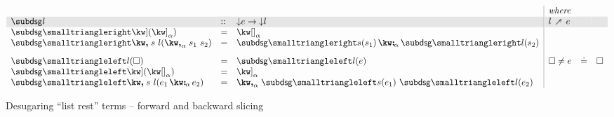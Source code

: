 \begin{figure}[H]
\small
$\begin{array}{lll|llll}
   \arrayrulecolor{lightgray}
   &&&\textit{where}
   \\
   \rowcolor{verylightgray}
   \desugarGC{l} &::& \Below{e} \to \Below{l}
   & l \desugarFwd e
   &&
   \\
   \desugarFwdF{\exListEnd}(\annot{\exListEnd}{\alpha})
   &=&
   \annot{\exNil}{\alpha}
   \\
   \desugarFwdF{\exListNext{s}{l}}(\annListNext{s_1}{s_2}{\alpha})
   &=&
   \annCons{\desugarFwdF{s}(s_1)}{\desugarFwdF{l}(s_2)}{\alpha}
   \\[3mm]
   \desugarBwdF{l}(\hole)
   &=&
   \desugarBwdF{l}(e)
   &
   \hole \neq e &\eq& \hole
   \\
   \desugarBwdF{\exListEnd}(\annot{\exNil}{\alpha})
   &=&
   \annot{\exListEnd}{\alpha}
   \\
   \desugarBwdF{\exListNext{s}{l}}(\annCons{e_1}{e_2}{\alpha})
   &=&
   \annListNext{\desugarBwdF{s}(e_1)}{\desugarBwdF{l}(e_2)}{\alpha}
\end{array}$
\caption{Desugaring ``list rest'' terms -- forward and backward slicing}
\end{figure}
